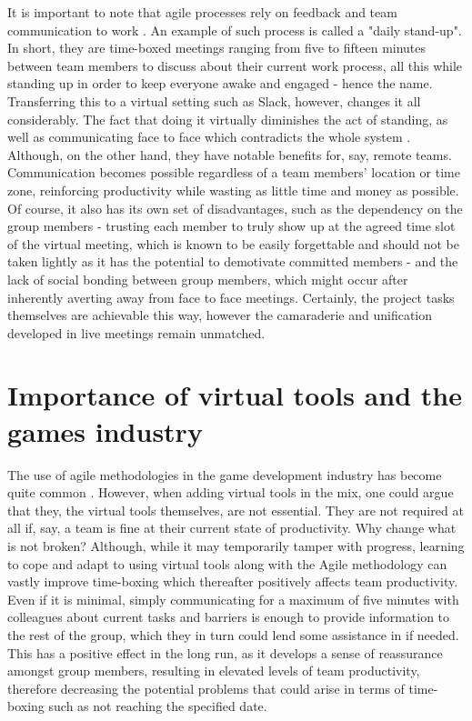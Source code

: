 \documentclass{scrartcl}
\begin{document}
It is important to note that agile processes rely on feedback and team communication to work \cite{Manifesto, Steve}. An example of such process is called a "daily stand-up". In short, they are time-boxed meetings ranging from five to fifteen minutes between team members to discuss about their current work process, all this while standing up in order to keep everyone awake and engaged - hence the name. \cite{McHugh} Transferring this to a virtual setting such as Slack, however, changes it all considerably. The fact that doing it virtually diminishes the act of standing, as well as communicating face to face which contradicts the whole system \cite{Lehmann}. Although, on the other hand, they have notable benefits for, say, remote teams. Communication becomes possible regardless of a team members' location or time zone, reinforcing productivity while wasting as little time and money as possible. Of course, it also has its own set of disadvantages, such as the dependency on the group members - trusting each member to truly show up at the agreed time slot of the virtual meeting, which is known to be easily forgettable and should not be taken lightly as it has the potential to demotivate committed members - and the lack of social bonding between group members, which might occur after inherently averting away from face to face meetings. \cite{Lehmann} Certainly, the project tasks themselves are achievable this way, however the camaraderie and unification developed in live meetings remain unmatched.

\section{Importance of virtual tools and the games industry}
The use of agile methodologies in the game development industry has become quite common \cite{Andre}. However, when adding virtual tools in the mix, one could argue that they, the virtual tools themselves, are not essential. They are not required at all if, say, a team is fine at their current state of productivity. Why change what is not broken? Although, while it may temporarily tamper with progress, learning to cope and adapt to using virtual tools along with the Agile methodology can vastly improve time-boxing which thereafter positively affects team productivity. Even if it is minimal, simply communicating for a maximum of five minutes with colleagues about current tasks and barriers is enough to provide information to the rest of the group, which they in turn could lend some assistance in if needed. This has a positive effect in the long run, as it develops a sense of reassurance amongst group members, resulting in elevated levels of team productivity, therefore decreasing the potential problems that could arise in terms of time-boxing such as not reaching the specified date.
\end{document}
